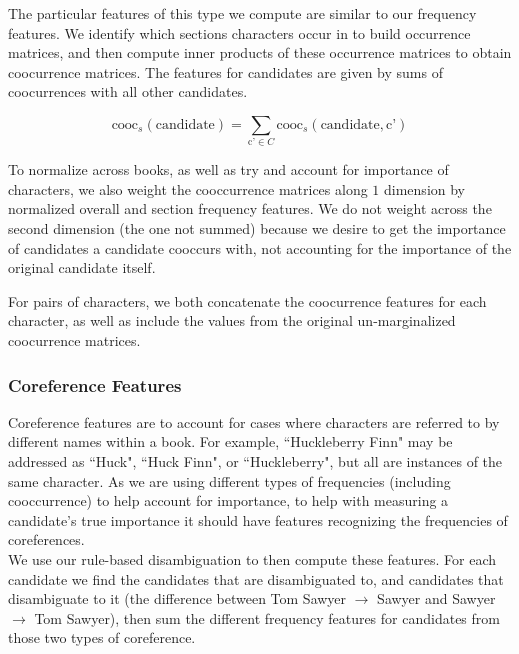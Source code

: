 \documentclass[12pt]{article}
\begin{document}
        The particular features of this type we compute are similar to our frequency features. We identify
        which sections characters occur in to build occurrence matrices, and then compute inner products
        of these occurrence matrices to obtain coocurrence matrices. The features for candidates are
        given by sums of coocurrences with all other candidates. 

        \[\mbox{cooc}_s(\mbox{candidate}) = \sum_{\mbox{c'} \in C} \mbox{cooc}_s(\mbox{candidate}, \mbox{c'})\]

        To normalize across books, as well as try and account for importance of characters, we also
        weight the cooccurrence matrices along $1$ dimension by normalized overall and section frequency
        features. We do not weight across the second dimension (the one not summed) because we desire to
        get the importance of candidates a candidate cooccurs with, not accounting for the importance
        of the original candidate itself.


        For pairs of characters, we both concatenate the coocurrence features for each character, as well
        as include the values from the original un-marginalized coocurrence matrices.

        \subsubsection{Coreference Features}
        
        Coreference features are to account for cases where characters are referred to by different 
        names within a book. For example, ``Huckleberry Finn" may be addressed as ``Huck", ``Huck Finn",
        or ``Huckleberry", but all are instances of the same character. As we are using different
        types of frequencies (including cooccurrence) to help account for importance, to help
        with measuring a candidate's true importance it should have features recognizing the 
        frequencies of coreferences. \\

        We use our rule-based disambiguation to then compute these features. For each candidate we
        find the candidates that are disambiguated to, and candidates that disambiguate to it
        (the difference between Tom Sawyer $\to$ Sawyer and Sawyer $\to$ Tom Sawyer), then sum
        the different frequency features for candidates from those two types of coreference.
\end{document}
